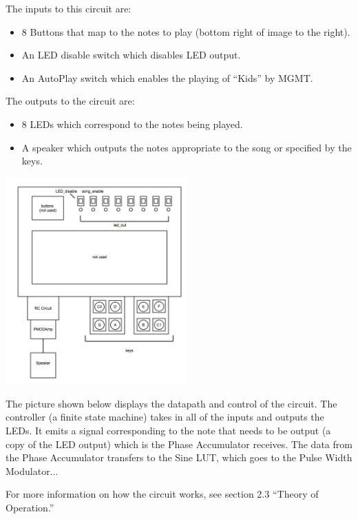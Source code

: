 \documentclass{article}
\begin{document}
    \begin{multicols}{2}
      The inputs to this circuit are:
      \begin{itemize}
        \item 8 Buttons that map to the notes to play (bottom right of image to the right).
        \item An LED disable switch which disables LED output.
        \item An AutoPlay switch which enables the playing of ``Kids'' by MGMT.
      \end{itemize}

      The outputs to the circuit are:
      \begin{itemize}
        \item 8 LEDs which correspond to the notes being played.
        \item A speaker which outputs the notes appropriate to the song or specified by the keys.
      \end{itemize}

    \columnbreak

      \includegraphics[width=2.75in]{img/FPGAtop.jpg}

    \end{multicols}

    The picture shown below displays the datapath and control of the circuit. The controller (a finite state machine) takes in all of the inputs and outputs the LEDs. It emits a signal corresponding to the note that needs to be output (a copy of the LED output) which is the Phase Accumulator receives. The data from the Phase Accumulator transfers to the Sine LUT, which goes to the Pulse Width Modulator... 

    For more information on how the circuit works, see section 2.3 ``Theory of Operation.''
\end{document}
